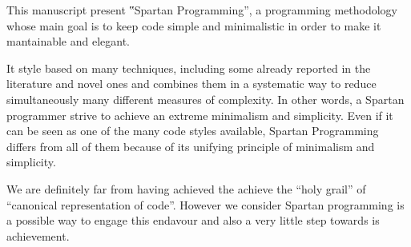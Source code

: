 
This manuscript present ‟Spartan Programming”, a programming methodology
whose main goal is to keep code simple and minimalistic in order to make it
mantainable and elegant. 

It style based on many techniques, including some already reported in the literature and novel
ones and combines them in a systematic way to reduce simultaneously many
different measures of complexity. In other words, a Spartan programmer strive
to achieve an extreme minimalism and simplicity. Even if it can be seen as one
of the many code styles available, Spartan Programming differs from all of them
because of its unifying principle of minimalism and simplicity.

We are definitely far from having achieved the achieve the ``holy grail'' of 
``canonical representation of code''. 
However we consider Spartan programming is a possible way to engage this endavour and 
also a very little step towards is achievement. 

